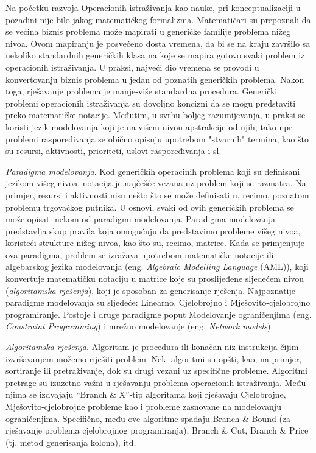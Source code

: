 \documentclass[a4paper, utf8, 11pt, colorlinks]{book}
\begin{document}
Na početku razvoja Operacionih istraživanja kao nauke, pri konceptualizaciji u pozadini nije bilo jakog matematičkog formalizma. Matematičari su prepoznali da se većina biznis problema može  mapirati u generičke familije problema nižeg nivoa. Ovom mapiranju je posvećeno dosta vremena, da bi se na kraju završilo sa nekoliko standardnih generičkih klasa na koje se mapira gotovo svaki problem iz operacionih istraživanja. U praksi, najveći dio vremena se provodi u konvertovanju biznis problema u jedan od poznatih generičkih problema. Nakon toga, rješavanje problema je manje-više standardna procedura. Generički problemi operacionih istraživanja su dovoljno koncizni da se mogu predstaviti preko matematičke notacije. Međutim, u svrhu boljeg razumijevanja, u praksi se koristi jezik modelovanja koji je na višem nivou apstrakcije od njih; tako npr. problemi raspoređivanja se obično opisuju upotrebom "stvarnih" termina, kao što su resursi, aktivnosti, prioriteti, uslovi raspoređivanja i sl. 

\emph{Paradigma modelovanja}. Kod generičkih operacinih problema koji su definisani jezikom višeg nivoa, notacija je najčešće vezana uz problem koji se razmatra.
Na primjer, resursi i aktivnosti nisu nešto što se može definisati u, recimo, poznatom problemu trgovačkog putnika. U osnovi, svaki od ovih generičkih problema se može opisati nekom od paradigmi modelovanja. Paradigma modelovanja predstavlja skup pravila koja omogućuju da predstavimo probleme višeg nivoa, koristeći strukture nižeg nivoa, kao što su, recimo, matrice. Kada se primjenjuje ova paradigma, problem se izražava upotrebom matematičke notacije ili algebarskog jezika modelovanja (eng. \emph{Algebraic Modelling Language} (AML)), koji konvertuje matematičku notaciju u matrice koje su proslijeđene sljedećem nivou (\emph{algoritamska rješenja}), koji je sposoban za generisanje rješenja. Najpoznatije paradigme modelovanja su sljedeće: Linearno, Cjelobrojno i Mješovito-cjelobrojno programiranje. Postoje i druge paradigme poput Modelovanje ograničenjima (eng. \emph{Constraint Programming}) i mrežno modelovanje (eng. \emph{Network models}). 

\emph{Algoritamska rješenja}. Algoritam je procedura ili konačan niz instrukcija čijim izvršavanjem možemo riješiti problem. Neki algoritmi su opšti, kao, na primjer, sortiranje ili pretraživanje,  dok su drugi vezani uz specifične probleme. Algoritmi pretrage su izuzetno važni u rješavanju problema operacionih istraživanja. Među njima se izdvajaju ``Branch \& X''-tip algoritama koji rješavaju Cjelobrojne, Mješovito-cjelobrojne probleme kao i probleme zasnovane na modelovanju ograničenjima. Specifično, među ove algoritme spadaju Branch \& Bound (za rješavanje problema cjelobrojnog programiranja), Branch \& Cut, Branch \& Price (tj. metod generisanja kolona), itd.
\end{document}
